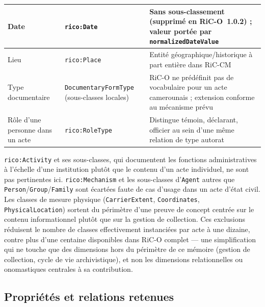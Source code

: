 \begin{table}[htbp]
\begin{tabularx}{\textwidth}{
            >{\raggedright\arraybackslash\hsize=0.8\hsize}X
            >{\raggedright\arraybackslash\hsize=0.9\hsize}X
            >{\raggedright\arraybackslash\hsize=1.3\hsize}X
        }
        \midrule
        Date                             & \texttt{rico:Date}                                  & Sans sous-classement (supprimé en RiC-O~1.0.2) ; valeur portée par \texttt{normalizedDateValue}         \\
        \midrule
        Lieu                             & \texttt{rico:Place}                                 & Entité géographique/historique à part entière dans RiC-CM                                               \\
        \midrule
        Type documentaire                & \texttt{DocumentaryFormType} (sous-classes locales) & RiC-O ne prédéfinit pas de vocabulaire pour un acte camerounais ; extension conforme au mécanisme prévu \\
        \midrule
        Rôle d'une personne dans un acte & \texttt{rico:RoleType}                              & Distingue témoin, déclarant, officier au sein d'une même relation de type autorat                       \\
        \bottomrule
    \end{tabularx}
\end{table}

\texttt{rico:Activity} et ses sous-classes, qui documentent les fonctions administratives à l'échelle d'une institution plutôt que le contenu d'un acte individuel, ne sont pas pertinentes ici. \texttt{rico:Mechanism} et les sous-classes d'\texttt{Agent} autres que \texttt{Person}/\texttt{Group}/\texttt{Family} sont écartées faute de cas d'usage dans un acte d'état civil.
Les classes de mesure physique (\texttt{CarrierExtent}, \texttt{Coordinates}, \texttt{PhysicalLocation}) sortent du périmètre d'une preuve de concept centrée sur le contenu informationnel plutôt que sur la gestion de collection.
Ces exclusions réduisent le nombre de classes effectivement instanciées par acte à une dizaine, contre plus d'une centaine disponibles dans RiC-O complet --- une simplification qui ne touche que des dimensions hors du périmètre de ce mémoire (gestion de collection, cycle de vie archivistique), et non les dimensions relationnelles ou onomastiques centrales à sa contribution.

\subsection{Propriétés et relations retenues}

